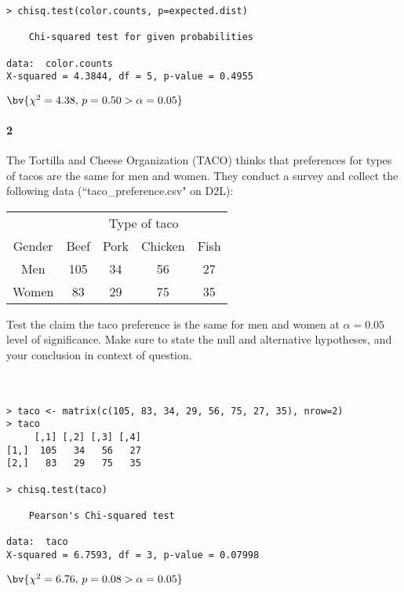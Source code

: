 \documentclass{article}
\begin{document}
\begin{flushleft}
\begin{enumalpha}
\begin{verbatim}
> chisq.test(color.counts, p=expected.dist)

	Chi-squared test for given probabilities

data:  color.counts
X-squared = 4.3844, df = 5, p-value = 0.4955

\end{verbatim}

$\bv{\chi^2 = 4.38, \, p = 0.50 > \alpha = 0.05}$\\

\end{enumalpha}



\newpage
\paragraph{2} The Tortilla and Cheese Organization (TACO) thinks that preferences for types of tacos are the same for men and women. They conduct a survey and collect the following data (``taco\_preference.csv" on D2L):\\
\medskip
{\centering
\begin{tabular}{c | c  c c c}
\multicolumn{1}{c}{} & \multicolumn{4}{c}{\large Type of taco}\\
Gender & Beef & Pork & Chicken & Fish\\
\hline
Men & 105 & 34 & 56 & 27\\
Women & 83 & 29 & 75 & 35 \\
\end{tabular}
\par}
\bigskip
Test the claim the taco preference is the same for men and women at $\alpha = 0.05$ level of significance. Make sure to state the null and alternative hypotheses, and your conclusion in context of question.\\
\medskip
{}\\
\\
\medskip
\begin{verbatim}
> taco <- matrix(c(105, 83, 34, 29, 56, 75, 27, 35), nrow=2)
> taco
     [,1] [,2] [,3] [,4]
[1,]  105   34   56   27
[2,]   83   29   75   35

> chisq.test(taco)

	Pearson's Chi-squared test

data:  taco
X-squared = 6.7593, df = 3, p-value = 0.07998
\end{verbatim}

$\bv{\chi^2 = 6.76, \, p = 0.08 > \alpha = 0.05}$\\


\vspace{3.25in}



\end{flushleft}
\end{document}
